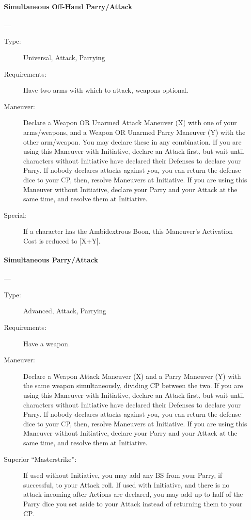 \documentclass[oneside,11pt,english]{book}
\begin{document}
\paragraph{\large\label{man:Simultaneous Off-Hand Parry/Attack}Simultaneous Off-Hand Parry/Attack}---\quad{\large[X+Y+2]}
\vspace{-10pt}\begin{description} 
\item [Type:] Universal, Attack, Parrying 
\item [Requirements:] Have two arms with which to attack, weapons optional. 
\item [Maneuver:] Declare a Weapon OR Unarmed Attack Maneuver (X) with one of your arms/weapons, and a 
Weapon OR Unarmed Parry Maneuver (Y) with the other arm/weapon. You may declare these in any 
combination. 
If you are using this Maneuver with Initiative, declare an Attack first, but wait until characters without 
Initiative have declared their Defenses to declare your Parry. If nobody declares attacks against you, you 
can return the defense dice to your CP, then, resolve Maneuvers at Initiative. 
If you are using this Maneuver without Initiative, declare your Parry and your Attack at the same time, 
and resolve them at Initiative. 
\item [Special:] If a character has the Ambidextrous Boon, this Maneuver’s Activation Cost is reduced to [X+Y]. 
\end{description}
\paragraph{\large\label{man:Simultaneous Parry/Attack}Simultaneous Parry/Attack}---\quad{\large[X+Y+2]}
\vspace{-10pt}\begin{description} 
\item [Type:] Advanced, Attack, Parrying 
\item [Requirements:] Have a weapon. 
\item [Maneuver:] Declare a Weapon Attack Maneuver (X) and a Parry Maneuver (Y) with the same weapon 
simultaneously, dividing CP between the two. 
If you are using this Maneuver with Initiative, declare an Attack first, but wait until characters without 
Initiative have declared their Defenses to declare your Parry. If nobody declares attacks against you, you 
can return the defense dice to your CP, then, resolve Maneuvers at Initiative. 
If you are using this Maneuver without Initiative, declare your Parry and your Attack at the same time, 
and resolve them at Initiative. 
\item [Superior “Masterstrike”:] If used without Initiative, you may add any BS from your Parry, if successful, 
to your Attack roll. If used with Initiative, and there is no attack incoming after Actions are declared, you 
may add up to half of the Parry dice you set aside to your Attack instead of returning them to your CP. 
\end{description}
\end{document}
